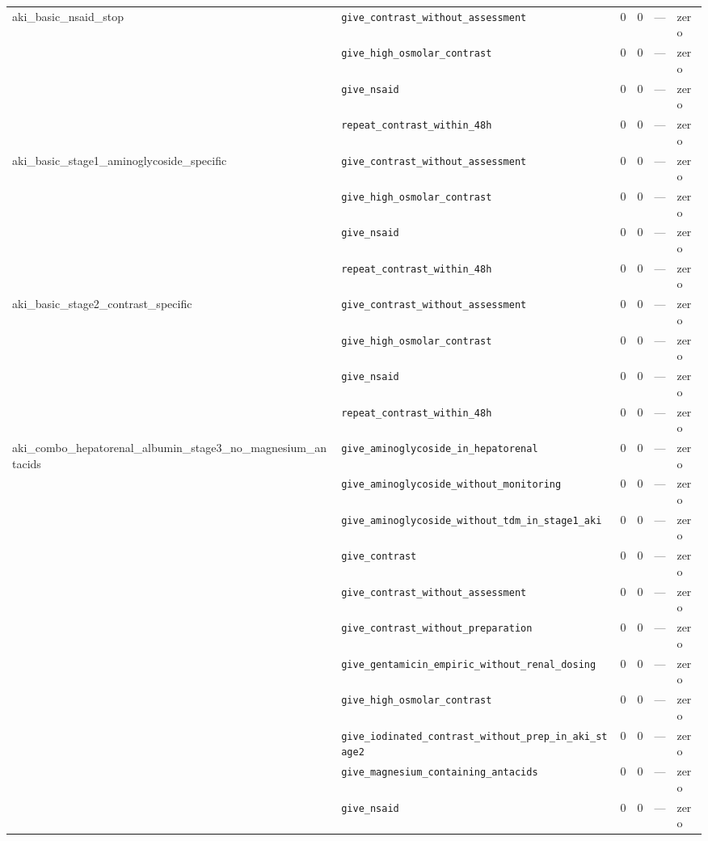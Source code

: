 \begin{table}[ht]
\begin{tabular}{llrrrl}
\midrule
aki\_basic\_nsaid\_stop & \texttt{give\_contrast\_without\_assessment} & 0 & 0 & — & zero \\
 & \texttt{give\_high\_osmolar\_contrast} & 0 & 0 & — & zero \\
 & \texttt{give\_nsaid} & 0 & 0 & — & zero \\
 & \texttt{repeat\_contrast\_within\_48h} & 0 & 0 & — & zero \\
\midrule
aki\_basic\_stage1\_aminoglycoside\_specific & \texttt{give\_contrast\_without\_assessment} & 0 & 0 & — & zero \\
 & \texttt{give\_high\_osmolar\_contrast} & 0 & 0 & — & zero \\
 & \texttt{give\_nsaid} & 0 & 0 & — & zero \\
 & \texttt{repeat\_contrast\_within\_48h} & 0 & 0 & — & zero \\
\midrule
aki\_basic\_stage2\_contrast\_specific & \texttt{give\_contrast\_without\_assessment} & 0 & 0 & — & zero \\
 & \texttt{give\_high\_osmolar\_contrast} & 0 & 0 & — & zero \\
 & \texttt{give\_nsaid} & 0 & 0 & — & zero \\
 & \texttt{repeat\_contrast\_within\_48h} & 0 & 0 & — & zero \\
\midrule
aki\_combo\_hepatorenal\_albumin\_stage3\_no\_magnesium\_antacids & \texttt{give\_aminoglycoside\_in\_hepatorenal} & 0 & 0 & — & zero \\
 & \texttt{give\_aminoglycoside\_without\_monitoring} & 0 & 0 & — & zero \\
 & \texttt{give\_aminoglycoside\_without\_tdm\_in\_stage1\_aki} & 0 & 0 & — & zero \\
 & \texttt{give\_contrast} & 0 & 0 & — & zero \\
 & \texttt{give\_contrast\_without\_assessment} & 0 & 0 & — & zero \\
 & \texttt{give\_contrast\_without\_preparation} & 0 & 0 & — & zero \\
 & \texttt{give\_gentamicin\_empiric\_without\_renal\_dosing} & 0 & 0 & — & zero \\
 & \texttt{give\_high\_osmolar\_contrast} & 0 & 0 & — & zero \\
 & \texttt{give\_iodinated\_contrast\_without\_prep\_in\_aki\_stage2} & 0 & 0 & — & zero \\
 & \texttt{give\_magnesium\_containing\_antacids} & 0 & 0 & — & zero \\
 & \texttt{give\_nsaid} & 0 & 0 & — & zero \\

\end{tabular}
\end{table}
